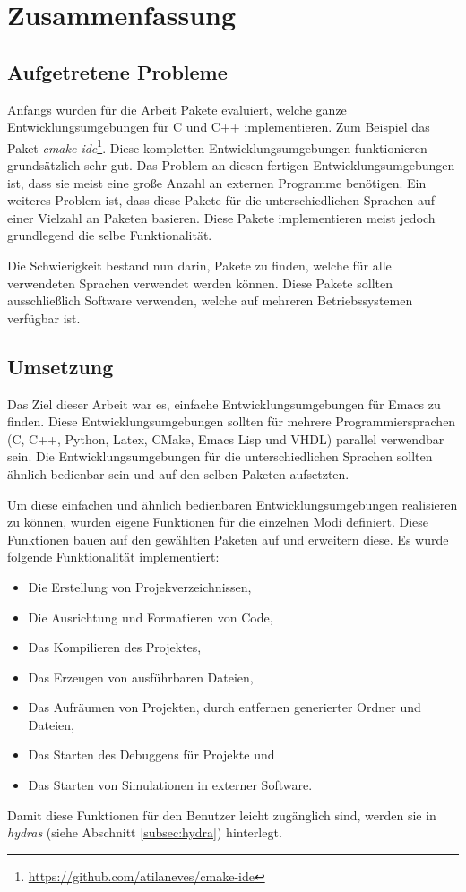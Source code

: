 \chapter{Zusammenfassung}
\label{cha:Zusammenfassung}
\section{Aufgetretene Probleme}
\label{sec:probleme}
Anfangs wurden für die Arbeit Pakete evaluiert, welche ganze
Entwicklungsumgebungen für C und C++ implementieren. Zum Beispiel das
Paket
\textit{cmake-ide}\footnote{\url{https://github.com/atilaneves/cmake-ide}}. Diese
kompletten Entwicklungsumgebungen funktionieren grundsätzlich sehr
gut. Das Problem an diesen fertigen Entwicklungsumgebungen ist, dass
sie meist eine große Anzahl an externen Programme benötigen. Ein
weiteres Problem ist, dass diese Pakete für die unterschiedlichen
Sprachen auf einer Vielzahl an Paketen basieren. Diese Pakete
implementieren meist jedoch grundlegend die selbe Funktionalität.

Die Schwierigkeit bestand nun darin, Pakete zu finden, welche für alle
verwendeten Sprachen verwendet werden können. Diese Pakete sollten
ausschließlich Software verwenden, welche auf mehreren
Betriebssystemen verfügbar ist.

\section{Umsetzung}
\label{sec:umsetzung}
Das Ziel dieser Arbeit war es, einfache Entwicklungsumgebungen für
Emacs zu finden. Diese Entwicklungsumgebungen sollten für mehrere
Programmiersprachen (C, C++, Python, Latex, CMake, Emacs Lisp und
VHDL) parallel verwendbar sein. Die Entwicklungsumgebungen für die
unterschiedlichen Sprachen sollten ähnlich bedienbar sein und auf den
selben Paketen aufsetzten.

Um diese einfachen und ähnlich bedienbaren Entwicklungsumgebungen
realisieren zu können, wurden eigene Funktionen für die einzelnen Modi
definiert. Diese Funktionen bauen auf den gewählten Paketen auf und
erweitern diese. Es wurde folgende Funktionalität implementiert:
\begin{itemize}
\item Die Erstellung von Projekverzeichnissen,
\item Die Ausrichtung und Formatieren von Code,
\item Das Kompilieren des Projektes,
\item Das Erzeugen von ausführbaren Dateien,
\item Das Aufräumen von Projekten, durch entfernen generierter Ordner
  und Dateien,
\item Das Starten des Debuggens für Projekte und
\item Das Starten von Simulationen in externer Software.\\
\end{itemize}
Damit diese Funktionen für den Benutzer leicht zugänglich sind, werden
sie in \textit{hydras} (siehe Abschnitt \ref{subsec:hydra})
hinterlegt.

